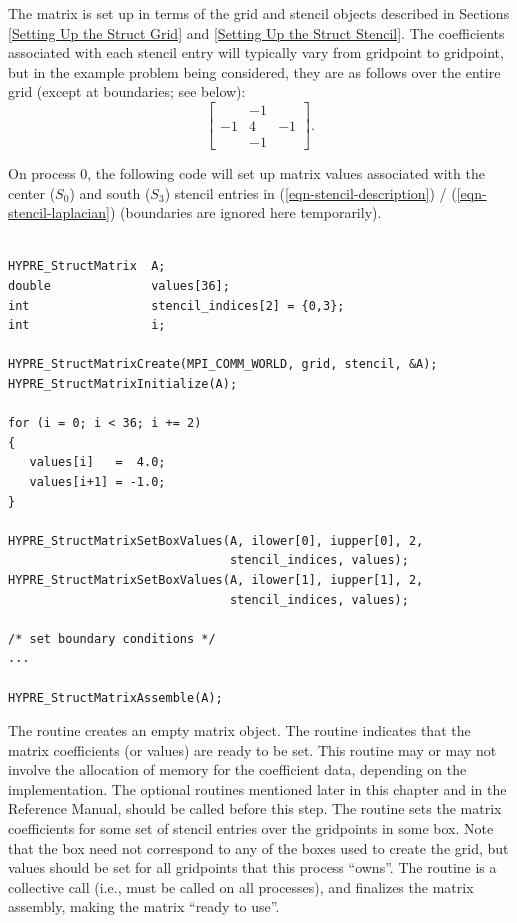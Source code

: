 The matrix is set up in terms of the grid and stencil objects
described in Sections
\ref{Setting Up the Struct Grid} and \ref{Setting Up the Struct Stencil}.
The coefficients associated with each stencil entry will typically
vary from gridpoint to gridpoint, but in the example problem being
considered, they are as follows over the entire grid (except at
boundaries; see below):
\begin{equation}\label{eqn-stencil-laplacian}
\left [
\begin{array}{ccc}
    & -1 &    \\
 -1 &  4 & -1 \\
    & -1 &    
\end{array}
\right ] .
\end{equation}

On process 0, the following code will set up matrix values associated
with the center ($S_0$) and south ($S_3$) stencil entries in
(\ref{eqn-stencil-description}) / (\ref{eqn-stencil-laplacian})
(boundaries are ignored here temporarily).
\begin{display}
\begin{verbatim}

HYPRE_StructMatrix  A;
double              values[36];
int                 stencil_indices[2] = {0,3};
int                 i;

HYPRE_StructMatrixCreate(MPI_COMM_WORLD, grid, stencil, &A);
HYPRE_StructMatrixInitialize(A);

for (i = 0; i < 36; i += 2)
{
   values[i]   =  4.0;
   values[i+1] = -1.0;
}

HYPRE_StructMatrixSetBoxValues(A, ilower[0], iupper[0], 2,
                               stencil_indices, values);
HYPRE_StructMatrixSetBoxValues(A, ilower[1], iupper[1], 2,
                               stencil_indices, values);

/* set boundary conditions */
...

HYPRE_StructMatrixAssemble(A);

\end{verbatim}
\end{display}
The  routine creates an empty matrix object.  The
 routine indicates that the matrix coefficients
(or values) are ready to be set.  This routine may or may not involve
the allocation of memory for the coefficient data, depending on the
implementation.  The optional  routines mentioned later in
this chapter and in the Reference Manual, should be called before this
step.  The  routine sets the matrix coefficients
for some set of stencil entries over the gridpoints in some box.  Note
that the box need not correspond to any of the boxes used to create
the grid, but values should be set for all gridpoints that this
process ``owns''.  The  routine is a collective call
(i.e., must be called on all processes), and finalizes the matrix
assembly, making the matrix ``ready to use''.

